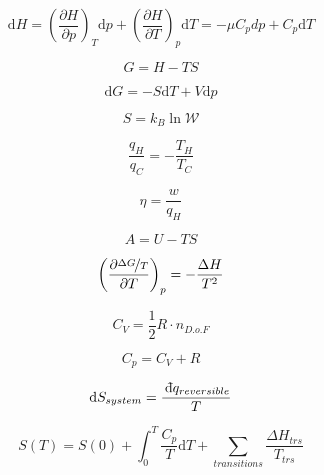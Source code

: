 \documentclass[12pt, letterpaper]{memoir}
\begin{document}
\begin{equation*}
	\mathrm{d}H=\left(\dfrac{\partial H}{\partial p}\right)_{\!\!T}\mathrm{d}p + \left(\dfrac{\partial H}{\partial T}\right)_{\!\!p}\mathrm{d}T=-\mu C_p{d}p + C_p\mathrm{d}T
\end{equation*}

\noindent
\begin{minipage}{0.5\linewidth}
	\begin{equation*}
		G = H-TS
	\end{equation*}

	\begin{equation*}
		\mathrm{d}G=-S\mathrm{d}T+V\mathrm{d}p
	\end{equation*}

	\begin{equation*}
		S=k_B\ln \mathcal{W}
	\end{equation*}

	\begin{equation*}
		\dfrac{q_H}{q_C}=-\dfrac{T_H}{T_C}
	\end{equation*}

	\begin{equation*}
		\eta = \dfrac{w}{q_H}
	\end{equation*}
\end{minipage}
\begin{minipage}{0.5\linewidth}
	\begin{equation*}
		A = U-TS
	\end{equation*}

	\begin{equation*}
		\left(\dfrac{\partial \nicefrac{\Delta G}{T}}{\partial T}\right)_p=-\dfrac{\Delta H}{T^2}
	\end{equation*}

	\begin{equation*}
		C_V = \dfrac{1}{2}R\cdot n_{D.o.F}
	\end{equation*}

	\begin{equation*}
		C_p = C_V+R
	\end{equation*}

	\begin{equation*}
		\mathrm{d} S_{system} = \dfrac{~\dbar q_{reversible}}{T}
	\end{equation*}
\end{minipage}

\begin{equation*}
	S(T)=S(0)+\int_0^T\dfrac{C_p}{T}\mathrm{d}T+\sum\limits_{transitions}\dfrac{\Delta H_{trs}}{T_{trs}}
\end{equation*}
\end{document}
